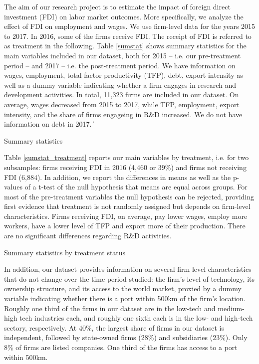 The aim of our research project is to estimate the impact of foreign direct investment (FDI) on labor market outcomes. More specifically, we analyze the effect of FDI on employment and wages. We use firm-level data for the years 2015 to 2017. In 2016, some of the firms receive FDI. The receipt of FDI is referred to as treatment in the following. Table \ref{sumstat} shows summary statistics for the main variables included in our dataset, both for 2015 -- i.e. our pre-treatment period -- and 2017 -- i.e. the post-treatment  period. We have information on wages, employment, total factor productivity (TFP), debt, export intensity as well as a dummy variable indicating whether a firm engages in research and development activities. In total, 11,323 firms are included in our dataset. On average, wages decreased from 2015 to 2017, while TFP, employment, export intensity, and the share of firms engageing in R\&D  increased. We do not have information on debt in 2017. \| \par 


\begin{table}[htbp]\centering \caption{Summary statistics\label{sumstat}}

 \end{table}


Table \ref{sumstat_treatment} reports our main variables by treatment, i.e. for two subsamples: firms receiving FDI in 2016 (4,460 or 39\%)  and firms not receiving FDI (6,884). In addition, we report the differences in means as well as the p-values of a t-test of the null hypothesis that means are equal across groups. For most of the pre-treatment variables the null hypothesis can be rejected, providing first evidence that treatment is not randomly assigned but depends on firm-level characteristics. Firms receiving FDI, on average, pay lower wages, employ more workers, have a lower level of TFP and export more of their production. There are no significant differences regarding R\&D activities.  \\ \par 

\begin{table}[htbp]\centering \caption{Summary statistics by treatment status\label{sumstat_treatment}}

\end{table} 


In addition, our dataset provides information on several firm-level characteristics that do not change over the time period studied: the firm's level of technology, its ownership structure, and its access to the world market, proxied by a dummy variable indicating whether there is a port within 500km of the firm's location. Roughly one third of the firms in our dataset are in the low-tech and medium-high tech industries each, and roughly one sixth each is in the low- and high-tech sectory, respectively. At 40\%, the largest share of firms in our dataset is independent, followed by state-owned firms (28\%) and subsidiaries (23\%). Only 8\% of firms are listed companies. One third of the firms has access to a port within 500km. \\ \par

